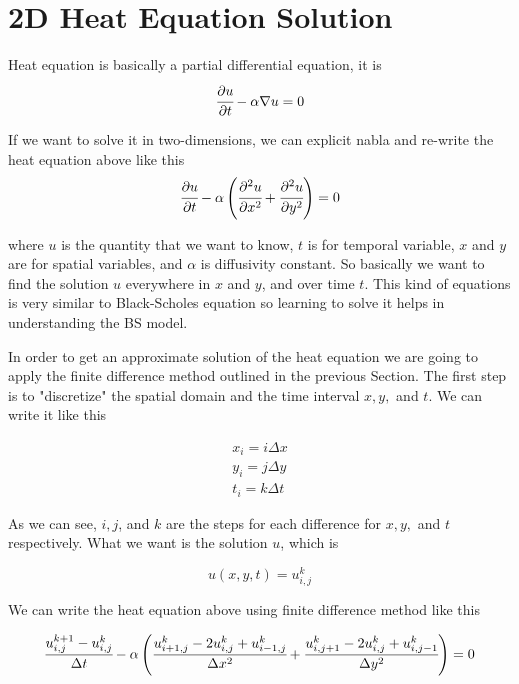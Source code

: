 \section{2D Heat Equation Solution}
Heat equation is basically a partial differential equation, it is
\begin{equation}
\cfrac{\partial u}{\partial t} - \alpha\nabla u = 0
\end{equation}

If we want to solve it in two-dimensions, we can explicit nabla and re-write the heat equation above like this
\begin{equation}
\cfrac{\partial u}{\partial t} - \alpha\left(\cfrac{\partial^2 u}{\partial x^2}+\cfrac{\partial^2 u}{\partial y^2}\right)= 0
\end{equation}

where $u$ is the quantity that we want to know, $t$ is for temporal variable, $x$ and $y$ are for spatial variables, and $\alpha$ is diffusivity constant. So basically we want to find the solution $u$ everywhere in $x$ and $y$, and over time $t$.
This kind of equations is very similar to Black-Scholes equation so learning to solve it helps in understanding the BS model.

In order to get an approximate solution of the heat equation we are going to apply the finite difference method outlined in the previous Section. The first step is to "discretize" the spatial domain and the time interval $x, y,$ and $t$. We can write it like this

\begin{gather}
x_i = i\Delta x \\
y_i = j\Delta y \\
t_i = k\Delta t 
\end{gather}

As we can see, $i, j$, and $k$ are the steps for each difference for $x, y,$ and $t$ respectively. What we want is the solution $u$, which is

\begin{equation}
u(x, y, t) = u_{i,j}^k
\end{equation}

We can write the heat equation above using finite difference method like this

\begin{equation}
\cfrac{u_{i,j}^{k+1}-u_{i,j}^k}{\Delta t} - \alpha\left(\cfrac{u_{i+1,j}^{k}-2u_{i,j}^{k}+u_{i-1,j}^{k}}{\Delta x^2}+\cfrac{u_{i,j+1}^{k}-2u_{i,j}^{k}+u_{i,j-1}^{k}}{\Delta y^2}\right)=0
\end{equation}

